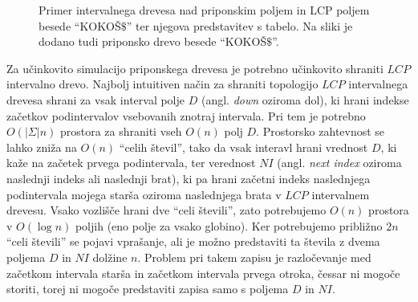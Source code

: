 \begin{figure}[tb]
    \begin{subfigure}[C]{0.45\linewidth}
        \vfill       
        
        \centering
        \vfill
        \subcaption*{}
        \label{fig:aSADrevo}
    \end{subfigure}
    \hfill
    \begin{subfigure}[C]{0.45\linewidth}        
        
        \centering
        \subcaption*{}
        \label{fig:aSAPolje}
    \end{subfigure}
   
    \caption{Primer intervalnega drevesa nad priponskim poljem in LCP poljem besede \enquote{KOKOŠ$\$$} ter njegova predstavitev s tabelo. Na sliki je dodano tudi priponsko drevo besede \enquote{KOKOŠ$\$$}.} 
    \label{fig:intervalTree}
\end{figure}

Za učinkovito simulacijo priponskega drevesa je potrebno učinkovito shraniti $LCP$ intervalno drevo. Najbolj intuitiven način za shraniti topologijo $LCP$ intervalnega drevesa shrani za vsak interval polje $D$ (angl. \textit{down} oziroma dol), ki hrani indekse začetkov podintervalov vsebovanih znotraj intervala. Pri tem je potrebno $O(|\Sigma|n)$ prostora za shraniti vseh $O(n)$ polj $D$. Prostorsko zahtevnost se lahko zniža na $O(n)$ \enquote{celih števil}, tako da vsak interavl hrani vrednost $D$, ki kaže na začetek prvega podintervala, ter verednost $NI$ (angl. \textit{next index} oziroma naslednji indeks ali naslednji brat), ki pa hrani začetni indeks naslednjega podintervala mojega starša oziroma naslednjega brata v $LCP$ intervalnem drevesu. Vsako vozlišče hrani dve \enquote{celi števili}, zato potrebujemo $O(n)$ prostora v $O(\log{n})$ poljih (eno polje za vsako globino). Ker potrebujemo približno $2n$ \enquote{celi števili} se pojavi vprašanje, ali je možno predstaviti ta števila z dvema poljema $D$ in $NI$ dolžine $n$. Problem pri takem zapisu je razločevanje med začetkom intervala starša in začetkom intervala prvega otroka, čessar ni mogoče storiti, torej ni mogoče predstaviti zapisa samo s poljema $D$ in $NI$.


